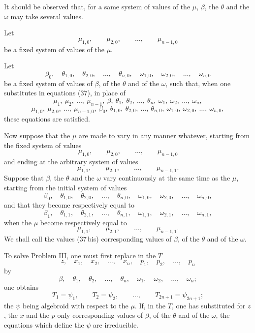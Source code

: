 \documentclass[11pt]{article}
\begin{document}
It should be observed that, for a same system of values of the $\mu$, $\beta$, the $\theta$ and the $\omega$ may take several values.

Let
\[
\mu_{1,0},\qquad \mu_{2,0},\qquad \ldots,\qquad \mu_{n-1,0}
\]
be a fixed system of values of the $\mu$.

Let
\[
\beta_0,\quad \theta_{1,0},\quad \theta_{2,0},\quad \ldots,\quad \theta_{n,0},\quad
\omega_{1,0},\quad \omega_{2,0},\quad \ldots,\quad \omega_{n,0}
\]
be a fixed system of values of $\beta$, of the $\theta$ and of the $\omega$, such that, when one substitutes in equations (37), in place of
\[
\mu_1,\ \mu_2,\ \ldots,\ \mu_{n-1},\ \beta,\ \theta_1,\ \theta_2,\ \ldots,\ \theta_n,\ \omega_1,\ \omega_2,\ \ldots,\ \omega_n,
\]
\[
\mu_{1,0},\ \mu_{2,0},\ \ldots,\ \mu_{n-1,0},\ \beta_0,\ \theta_{1,0},\ \theta_{2,0},\ \ldots,\ \theta_{n,0},\ \omega_{1,0},\ \omega_{2,0},\ \ldots,\ \omega_{n,0},
\]
these equations are satisfied.

Now suppose that the $\mu$ are made to vary in any manner whatever, starting from the fixed system of values
\[
\mu_{1,0},\qquad \mu_{2,0},\qquad \ldots,\qquad \mu_{n-1,0}
\]
and ending at the arbitrary system of values
\[
\mu_{1,1},\qquad \mu_{2,1},\qquad \ldots,\qquad \mu_{n-1,1}.
\]
Suppose that $\beta$, the $\theta$ and the $\omega$ vary continuously at the same time as the $\mu$, starting from the initial system of values
\[
\beta_0,\quad \theta_{1,0},\quad \theta_{2,0},\quad \ldots,\quad \theta_{n,0},\quad
\omega_{1,0},\quad \omega_{2,0},\quad \ldots,\quad \omega_{n,0},
\]
and that they become respectively equal to
\begin{equation*}\tag{37\,bis}
\beta_1,\quad \theta_{1,1},\quad \theta_{2,1},\quad \ldots,\quad \theta_{n,1},\quad
\omega_{1,1},\quad \omega_{2,1},\quad \ldots,\quad \omega_{n,1},
\end{equation*}
when the $\mu$ become respectively equal to
\[
\mu_{1,1},\qquad \mu_{2,1},\qquad \ldots,\qquad \mu_{n-1,1}.
\]
We shall call the values (37\,bis) corresponding values of $\beta$, of the $\theta$ and of the $\omega$.

To solve Problem III, one must first replace in the $T$
\[
z,\quad x_1,\quad x_2,\quad \ldots,\quad x_n,\quad p_1,\quad p_2,\quad \ldots,\quad p_n
\]
by
\[
\beta,\quad \theta_1,\quad \theta_2,\quad \ldots,\quad \theta_n,\quad \omega_1,\quad \omega_2,\quad \ldots,\quad \omega_n;
\]
one obtains
\[
T_1=\psi_1,\qquad T_2=\psi_2,\qquad \ldots,\qquad T_{2n+1}=\psi_{2n+1};
\]
the $\psi$ being algebroid with respect to the $\mu$. If, in the $T$, one has substituted for $z$, the $x$ and the $p$ only corresponding values of $\beta$, of the $\theta$ and of the $\omega$, the equations which define the $\psi$ are irreducible.
\end{document}
